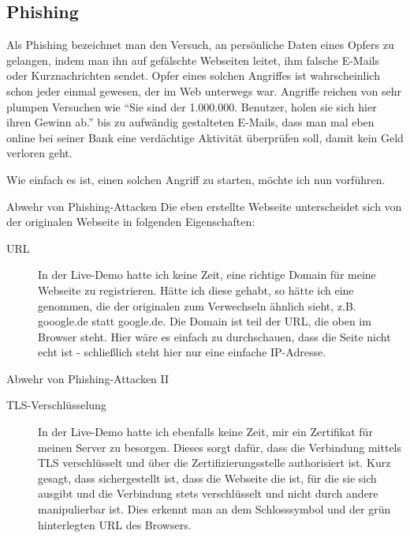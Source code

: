 \documentclass[utf8]{beamer}
\begin{document}
	\subsection{Phishing}
	\begin{frame}
		Als Phishing bezeichnet man den Versuch, an persönliche Daten eines Opfers zu gelangen, indem man ihn auf gefälschte Webseiten leitet, ihm falsche E-Mails oder Kurznachrichten sendet.
		Opfer eines solchen Angriffes ist wahrscheinlich schon jeder einmal gewesen, der im Web unterwegs war. Angriffe reichen von sehr plumpen Versuchen wie \enquote{Sie sind der 1.000.000. Benutzer, holen sie sich hier ihren Gewinn ab.} bis zu aufwändig gestalteten E-Mails, dass man mal eben online bei seiner Bank eine verdächtige Aktivität überprüfen soll, damit kein Geld verloren geht.
	\end{frame}

	\begin{frame}
		Wie einfach es ist, einen solchen Angriff zu starten, möchte ich nun vorführen.
	\end{frame}
	
	\begin{frame}{Abwehr von Phishing-Attacken}
		Die eben erstellte Webseite unterscheidet sich von der originalen Webseite in folgenden Eigenschaften:		
		\begin{description}
			\item[URL] {In der Live-Demo hatte ich keine Zeit, eine richtige Domain für meine Webseite zu registrieren. Hätte ich diese gehabt, so hätte ich eine genommen, die der originalen zum Verwechseln ähnlich sieht, z.B. gooogle.de statt google.de.
			Die Domain ist teil der URL, die oben im Browser steht.
			Hier wäre es einfach zu durchschauen, dass die Seite nicht echt ist - schließlich steht hier nur eine einfache IP-Adresse.}
		\end{description}
	\end{frame}

	\begin{frame}{Abwehr von Phishing-Attacken II}
		\begin{description}
			\item[TLS-Verschlüsselung] {In der Live-Demo hatte ich ebenfalls keine Zeit, mir ein Zertifikat für meinen Server zu besorgen. Dieses sorgt dafür, dass die Verbindung mittels TLS verschlüsselt und über die Zertifizierungsstelle authorisiert ist. Kurz gesagt, dass sichergestellt ist, dass die Webseite die ist, für die sie sich ausgibt und die Verbindung stets verschlüsselt und nicht durch andere manipulierbar ist. Dies erkennt man an dem Schlosssymbol und der grün hinterlegten URL des Browsers.}			
		\end{description}
	\end{frame}
	
\end{document}
